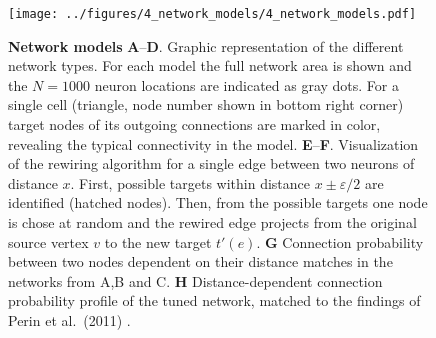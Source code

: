 
\begin{figure}[h]
    \vspace{0.25cm}
  \texttt{[image: ../figures/4\_network\_models/4\_network\_models.pdf]} %
  \vspace{0.15cm}
\caption{{\bf Network models} \textbf{A}--\textbf{D}. Graphic representation of the different network types. For each model the full network area is shown and the $N=1000$ neuron locations are indicated as gray dots. For a single cell (triangle, node number shown in bottom right corner) target nodes of its outgoing connections are marked in color, revealing the typical connectivity in the model. \textbf{E}--\textbf{F}. Visualization of the rewiring algorithm for a single edge between two neurons of distance $x$. First, possible targets within distance $x \pm \varepsilon/2$ are identified (hatched nodes). Then, from the possible targets one node is chose at random and the rewired edge projects from the original source vertex $v$ to the new target $t'(e)$. \textbf{G} Connection probability between two nodes dependent on their distance matches in the networks from A,B and C. \textbf{H} Distance-dependent connection probability profile of the tuned network, matched to the findings of Perin et al.~(2011) \cite{Perin2011}.
}
\label{fig:4_net_models}
\end{figure}
